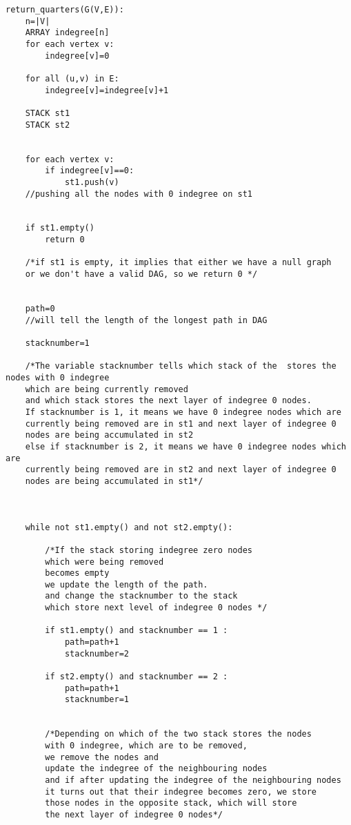 \documentclass[answers]{exam}
\begin{document}
\begin{questions}
\begin{solution}
\begin{verbatim}
return_quarters(G(V,E)):
    n=|V|
    ARRAY indegree[n]
    for each vertex v:
        indegree[v]=0

    for all (u,v) in E:
        indegree[v]=indegree[v]+1

    STACK st1
    STACK st2
    
    
    for each vertex v:
        if indegree[v]==0:
            st1.push(v)
    //pushing all the nodes with 0 indegree on st1
    
    
    if st1.empty()
        return 0

    /*if st1 is empty, it implies that either we have a null graph
    or we don't have a valid DAG, so we return 0 */

    
    path=0
    //will tell the length of the longest path in DAG
    
    stacknumber=1
    
    /*The variable stacknumber tells which stack of the  stores the nodes with 0 indegree 
    which are being currently removed 
    and which stack stores the next layer of indegree 0 nodes.
    If stacknumber is 1, it means we have 0 indegree nodes which are 
    currently being removed are in st1 and next layer of indegree 0
    nodes are being accumulated in st2
    else if stacknumber is 2, it means we have 0 indegree nodes which are 
    currently being removed are in st2 and next layer of indegree 0
    nodes are being accumulated in st1*/

    

    while not st1.empty() and not st2.empty():

        /*If the stack storing indegree zero nodes
        which were being removed
        becomes empty 
        we update the length of the path.
        and change the stacknumber to the stack
        which store next level of indegree 0 nodes */
        
        if st1.empty() and stacknumber == 1 :
            path=path+1
            stacknumber=2
    
        if st2.empty() and stacknumber == 2 :
            path=path+1
            stacknumber=1

        
        /*Depending on which of the two stack stores the nodes
        with 0 indegree, which are to be removed, 
        we remove the nodes and
        update the indegree of the neighbouring nodes
        and if after updating the indegree of the neighbouring nodes
        it turns out that their indegree becomes zero, we store
        those nodes in the opposite stack, which will store
        the next layer of indegree 0 nodes*/
        

\end{verbatim}
\end{solution}
\end{questions}
\end{document}
